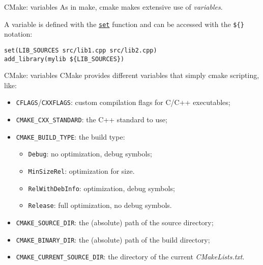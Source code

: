 % 
% 

\begin{frame}[fragile]{CMake: variables}
    As in make, cmake makes extensive use of \emph{variables}. 

    A variable is defined with the \href{https://cmake.org/cmake/help/latest/command/set.html#set}{\texttt{set}} function and can be accessed with the \alert{\texttt{\$\{\}}} notation:
\begin{lstlisting}
set(LIB_SOURCES src/lib1.cpp src/lib2.cpp)
add_library(mylib ${LIB_SOURCES})
\end{lstlisting}
\end{frame}

\begin{frame}[fragile]{CMake: variables}
    CMake provides different variables that simply cmake scripting, like:
    \begin{itemize}
        \item \texttt{CFLAGS}/\texttt{CXXFLAGS}: custom compilation flags for C/C++ executables;
        \item \texttt{CMAKE\_CXX\_STANDARD}: the C++ standard to use;
        \item \texttt{CMAKE\_BUILD\_TYPE}: the build type:
        \begin{itemize}
            \item \texttt{Debug}: no optimization, debug symbols;
            \item \texttt{MinSizeRel}: optimization for size.
            \item \texttt{RelWithDebInfo}: optimization, debug symbols;
            \item \texttt{Release}: full optimization, no debug symbols.
        \end{itemize}
        
        \item \texttt{CMAKE\_SOURCE\_DIR}: the (absolute) path of the source directory;
        \item \texttt{CMAKE\_BINARY\_DIR}: the (absolute) path of the build directory;
        \item \texttt{CMAKE\_CURRENT\_SOURCE\_DIR}: the directory of the current \textit{CMakeLists.txt}.
    \end{itemize}
\end{frame}

